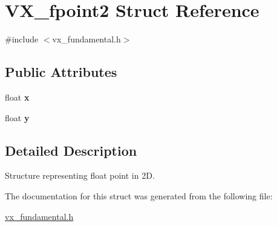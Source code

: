 \hypertarget{structVX__fpoint2}{\section{V\-X\-\_\-fpoint2 Struct Reference}
\label{structVX__fpoint2}
}


{\ttfamily \#include $<$vx\-\_\-fundamental.\-h$>$}

\subsection*{Public Attributes}
\begin{DoxyCompactItemize}
\item 
\hypertarget{structVX__fpoint2_ae917a5d07e6c0327456a3f9fb4e63c1e}{float {\bfseries x}}\label{structVX__fpoint2_ae917a5d07e6c0327456a3f9fb4e63c1e}

\item 
\hypertarget{structVX__fpoint2_a3ce1aae790319e9fe06fb00e44e80992}{float {\bfseries y}}\label{structVX__fpoint2_a3ce1aae790319e9fe06fb00e44e80992}

\end{DoxyCompactItemize}


\subsection{Detailed Description}
Structure representing float point in 2\-D. 

The documentation for this struct was generated from the following file\-:\begin{DoxyCompactItemize}
\item 
\hyperlink{vx__fundamental_8h}{vx\-\_\-fundamental.\-h}\end{DoxyCompactItemize}
